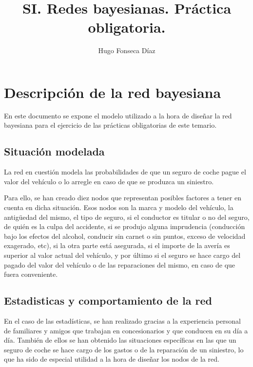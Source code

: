 \documentclass[11pt]{article}
\begin{document}
\title{SI. Redes bayesianas. Práctica obligatoria.}
\author{Hugo Fonseca Díaz\\ }
\maketitle
\section{Descripción de la red bayesiana}
En este documento se expone el modelo utilizado a la hora de diseñar la red bayesiana para el ejercicio de las prácticas obligatorias de este temario.
\subsection{Situación modelada}
La red en cuestión modela las probabilidades de que un seguro de coche pague el valor del vehículo o lo arregle en caso de que se produzca un siniestro.

Para ello, se han creado diez nodos que representan posibles factores a tener en cuenta en dicha situación. Esos nodos son la marca y modelo del vehículo, la antigüedad del mismo, el tipo de seguro, si el conductor es titular o no del seguro, de quién es la culpa del accidente, si se produjo alguna imprudencia (conducción bajo los efectos del alcohol, conducir sin carnet o sin puntos, exceso de velocidad exagerado, etc), si la otra parte está asegurada, si el importe de la avería es superior al valor actual del vehículo, y por último si el seguro se hace cargo del pagado del valor del vehículo o de las reparaciones del mismo, en caso de que fuera conveniente.
\subsection{Estadisticas y comportamiento de la red}
En el caso de las estadísticas, se han realizado gracias a la experiencia personal de familiares y amigos que trabajan en concesionarios y que conducen en su día a día. También de ellos se han obtenido las situaciones específicas en las que un seguro de coche se hace cargo de los gastos o de la reparación de un siniestro, lo que ha sido de especial utilidad a la hora de diseñar los nodos de la red.
\end{document}
